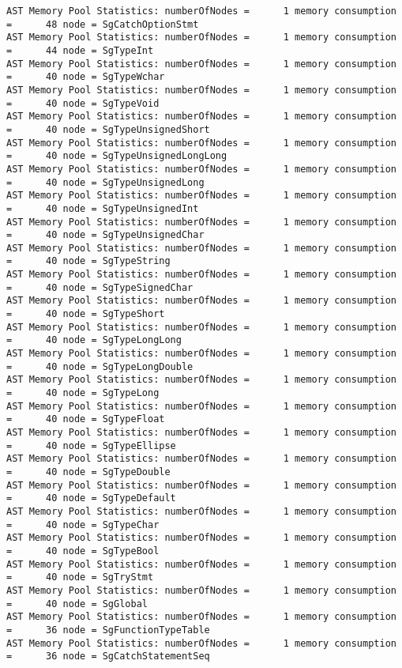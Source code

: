 {{\begin{verbatim}
AST Memory Pool Statistics: numberOfNodes =      1 memory consumption =      48 node = SgCatchOptionStmt
AST Memory Pool Statistics: numberOfNodes =      1 memory consumption =      44 node = SgTypeInt
AST Memory Pool Statistics: numberOfNodes =      1 memory consumption =      40 node = SgTypeWchar
AST Memory Pool Statistics: numberOfNodes =      1 memory consumption =      40 node = SgTypeVoid
AST Memory Pool Statistics: numberOfNodes =      1 memory consumption =      40 node = SgTypeUnsignedShort
AST Memory Pool Statistics: numberOfNodes =      1 memory consumption =      40 node = SgTypeUnsignedLongLong
AST Memory Pool Statistics: numberOfNodes =      1 memory consumption =      40 node = SgTypeUnsignedLong
AST Memory Pool Statistics: numberOfNodes =      1 memory consumption =      40 node = SgTypeUnsignedInt
AST Memory Pool Statistics: numberOfNodes =      1 memory consumption =      40 node = SgTypeUnsignedChar
AST Memory Pool Statistics: numberOfNodes =      1 memory consumption =      40 node = SgTypeString
AST Memory Pool Statistics: numberOfNodes =      1 memory consumption =      40 node = SgTypeSignedChar
AST Memory Pool Statistics: numberOfNodes =      1 memory consumption =      40 node = SgTypeShort
AST Memory Pool Statistics: numberOfNodes =      1 memory consumption =      40 node = SgTypeLongLong
AST Memory Pool Statistics: numberOfNodes =      1 memory consumption =      40 node = SgTypeLongDouble
AST Memory Pool Statistics: numberOfNodes =      1 memory consumption =      40 node = SgTypeLong
AST Memory Pool Statistics: numberOfNodes =      1 memory consumption =      40 node = SgTypeFloat
AST Memory Pool Statistics: numberOfNodes =      1 memory consumption =      40 node = SgTypeEllipse
AST Memory Pool Statistics: numberOfNodes =      1 memory consumption =      40 node = SgTypeDouble
AST Memory Pool Statistics: numberOfNodes =      1 memory consumption =      40 node = SgTypeDefault
AST Memory Pool Statistics: numberOfNodes =      1 memory consumption =      40 node = SgTypeChar
AST Memory Pool Statistics: numberOfNodes =      1 memory consumption =      40 node = SgTypeBool
AST Memory Pool Statistics: numberOfNodes =      1 memory consumption =      40 node = SgTryStmt
AST Memory Pool Statistics: numberOfNodes =      1 memory consumption =      40 node = SgGlobal
AST Memory Pool Statistics: numberOfNodes =      1 memory consumption =      36 node = SgFunctionTypeTable
AST Memory Pool Statistics: numberOfNodes =      1 memory consumption =      36 node = SgCatchStatementSeq
\end{verbatim}
}
}

